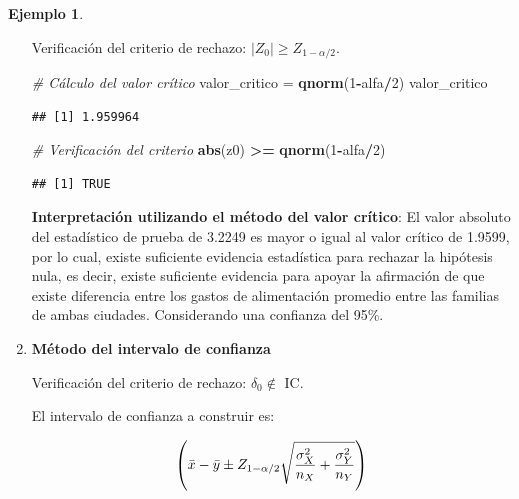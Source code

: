 \documentclass[
  11pt,
]{book}
\newenvironment{Shaded}{\begin{snugshade}}{\end{snugshade}}
\newcommand{\CommentTok}[1]{\textcolor[rgb]{0.56,0.35,0.01}{\textit{#1}}}
\newcommand{\DecValTok}[1]{\textcolor[rgb]{0.00,0.00,0.81}{#1}}
\newcommand{\FunctionTok}[1]{\textcolor[rgb]{0.13,0.29,0.53}{\textbf{#1}}}
\newcommand{\NormalTok}[1]{#1}
\newcommand{\OtherTok}[1]{\textcolor[rgb]{0.56,0.35,0.01}{#1}}
\newcommand{\SpecialCharTok}[1]{\textcolor[rgb]{0.81,0.36,0.00}{\textbf{#1}}}
\theoremstyle{definition}
\theoremstyle{definition}
\newtheorem{example}{Ejemplo}[chapter]
\theoremstyle{definition}
\theoremstyle{definition}
\theoremstyle{remark}
\begin{document}
\begin{example}
\begin{enumerate}
  Verificación del criterio de rechazo: \(|Z_0| \geq Z_{1-\alpha/2}\).

\begin{Shaded}
\begin{Highlighting}[]
\CommentTok{\# Cálculo del valor crítico}
\NormalTok{valor\_critico }\OtherTok{=} \FunctionTok{qnorm}\NormalTok{(}\DecValTok{1}\SpecialCharTok{{-}}\NormalTok{alfa}\SpecialCharTok{/}\DecValTok{2}\NormalTok{)}
\NormalTok{valor\_critico}
\end{Highlighting}
\end{Shaded}

\begin{verbatim}
## [1] 1.959964
\end{verbatim}

\begin{Shaded}
\begin{Highlighting}[]
\CommentTok{\# Verificación del criterio}
\FunctionTok{abs}\NormalTok{(z0) }\SpecialCharTok{\textgreater{}=} \FunctionTok{qnorm}\NormalTok{(}\DecValTok{1}\SpecialCharTok{{-}}\NormalTok{alfa}\SpecialCharTok{/}\DecValTok{2}\NormalTok{)}
\end{Highlighting}
\end{Shaded}

\begin{verbatim}
## [1] TRUE
\end{verbatim}

  \textbf{Interpretación utilizando el método del valor crítico}: El valor absoluto del estadístico de prueba de 3.2249 es mayor o igual al valor crítico de 1.9599, por lo cual, existe suficiente evidencia estadística para rechazar la hipótesis nula, es decir, existe suficiente evidencia para apoyar la afirmación de que existe diferencia entre los gastos de alimentación promedio entre las familias de ambas ciudades. Considerando una confianza del 95\%.
\item
  \textbf{Método del intervalo de confianza}

  Verificación del criterio de rechazo: \(\delta_0 \notin\) IC.

  El intervalo de confianza a construir es:

  \begin{equation}
    \notag
    \left(\bar{x} - \bar{y} \pm Z_{1-\alpha/2}\sqrt{\frac{\sigma_X^2}{n_X} + \frac{\sigma_Y^2}{n_Y}}\right)
  \end{equation}


\end{enumerate}
\end{example}
\end{document}
